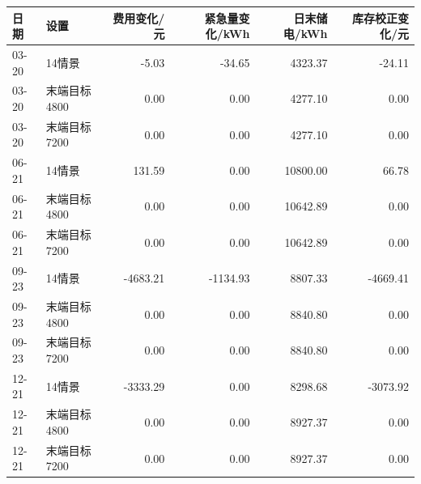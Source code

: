 \begin{tabular}{llrrrr}
\toprule
日期 & 设置 & 费用变化/元 & 紧急量变化/kWh & 日末储电/kWh & 库存校正变化/元 \\
\midrule
03-20 & 14情景 & -5.03 & -34.65 & 4323.37 & -24.11 \\
03-20 & 末端目标4800 & 0.00 & 0.00 & 4277.10 & 0.00 \\
03-20 & 末端目标7200 & 0.00 & 0.00 & 4277.10 & 0.00 \\
06-21 & 14情景 & 131.59 & 0.00 & 10800.00 & 66.78 \\
06-21 & 末端目标4800 & 0.00 & 0.00 & 10642.89 & 0.00 \\
06-21 & 末端目标7200 & 0.00 & 0.00 & 10642.89 & 0.00 \\
09-23 & 14情景 & -4683.21 & -1134.93 & 8807.33 & -4669.41 \\
09-23 & 末端目标4800 & 0.00 & 0.00 & 8840.80 & 0.00 \\
09-23 & 末端目标7200 & 0.00 & 0.00 & 8840.80 & 0.00 \\
12-21 & 14情景 & -3333.29 & 0.00 & 8298.68 & -3073.92 \\
12-21 & 末端目标4800 & 0.00 & 0.00 & 8927.37 & 0.00 \\
12-21 & 末端目标7200 & 0.00 & 0.00 & 8927.37 & 0.00 \\
\bottomrule
\end{tabular}